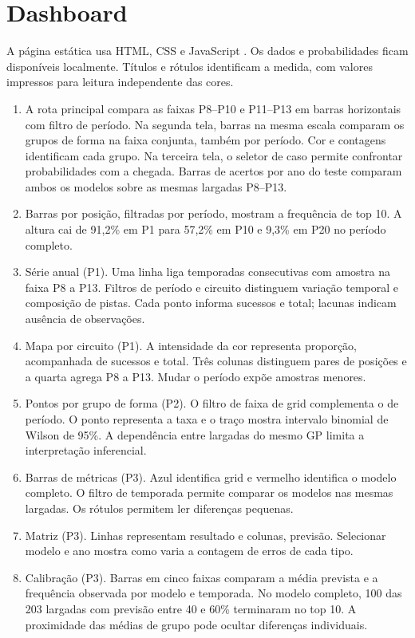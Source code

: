 \documentclass[conference,a4paper]{IEEEtran}
\begin{document}
\section{Dashboard}
A página estática usa HTML, CSS e JavaScript \cite{web}. Os dados e probabilidades ficam disponíveis localmente. Títulos e rótulos identificam a medida, com valores impressos para leitura independente das cores.
\begin{enumerate}
\item A rota principal compara as faixas P8--P10 e P11--P13 em barras horizontais com filtro de período. Na segunda tela, barras na mesma escala comparam os grupos de forma na faixa conjunta, também por período. Cor e contagens identificam cada grupo. Na terceira tela, o seletor de caso permite confrontar probabilidades com a chegada. Barras de acertos por ano do teste comparam ambos os modelos sobre as mesmas largadas P8--P13.
\item Barras por posição, filtradas por período, mostram a frequência de top 10. A altura cai de 91,2\% em P1 para 57,2\% em P10 e 9,3\% em P20 no período completo.
\item Série anual (P1). Uma linha liga temporadas consecutivas com amostra na faixa P8 a P13. Filtros de período e circuito distinguem variação temporal e composição de pistas. Cada ponto informa sucessos e total; lacunas indicam ausência de observações.
\item Mapa por circuito (P1). A intensidade da cor representa proporção, acompanhada de sucessos e total. Três colunas distinguem pares de posições e a quarta agrega P8 a P13. Mudar o período expõe amostras menores.
\item Pontos por grupo de forma (P2). O filtro de faixa de grid complementa o de período. O ponto representa a taxa e o traço mostra intervalo binomial de Wilson de 95\%. A dependência entre largadas do mesmo GP limita a interpretação inferencial.
\item Barras de métricas (P3). Azul identifica grid e vermelho identifica o modelo completo. O filtro de temporada permite comparar os modelos nas mesmas largadas. Os rótulos permitem ler diferenças pequenas.
\item Matriz (P3). Linhas representam resultado e colunas, previsão. Selecionar modelo e ano mostra como varia a contagem de erros de cada tipo.
\item Calibração (P3). Barras em cinco faixas comparam a média prevista e a frequência observada por modelo e temporada. No modelo completo, 100 das 203 largadas com previsão entre 40 e 60\% terminaram no top 10. A proximidade das médias de grupo pode ocultar diferenças individuais.

\end{enumerate}
\end{document}
